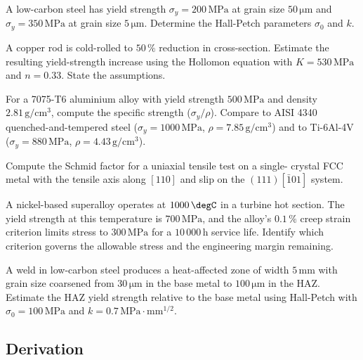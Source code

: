 \begin{exercise}
A low-carbon steel has yield strength $\sigma_y = 200\,\text{MPa}$ at
grain size $50\,\si{\micro\meter}$ and $\sigma_y = 350\,\text{MPa}$ at
grain size $5\,\si{\micro\meter}$. Determine the Hall-Petch parameters
$\sigma_0$ and $k$.
\end{exercise}

\begin{exercise}
A copper rod is cold-rolled to $50\,\%$ reduction in cross-section.
Estimate the resulting yield-strength increase using the Hollomon
equation with $K = 530\,\text{MPa}$ and $n = 0.33$. State the
assumptions.
\end{exercise}

\begin{exercise}
For a 7075-T6 aluminium alloy with yield strength $500\,\text{MPa}$
and density $2.81\,\text{g}/\text{cm}^3$, compute the specific
strength ($\sigma_y/\rho$). Compare to AISI 4340 quenched-and-tempered
steel ($\sigma_y = 1000\,\text{MPa}$, $\rho = 7.85\,\text{g}/\text{cm}^3$)
and to Ti-6Al-4V ($\sigma_y = 880\,\text{MPa}$, $\rho = 4.43\,\text{g}/
\text{cm}^3$).
\end{exercise}

\begin{exercise}
Compute the Schmid factor for a uniaxial tensile test on a single-
crystal FCC metal with the tensile axis along $[110]$ and slip on the
$(111)[\bar{1}01]$ system.
\end{exercise}

\begin{exercise}
A nickel-based superalloy operates at $1000\,\degC$ in a turbine
hot section. The yield strength at this temperature is $700\,\text{MPa}$,
and the alloy's $0.1\,\%$ creep strain criterion limits stress to
$300\,\text{MPa}$ for a $10\,000\,\text{h}$ service life. Identify
which criterion governs the allowable stress and the engineering
margin remaining.
\end{exercise}

\begin{exercise}
A weld in low-carbon steel produces a heat-affected zone of width
$5\,\text{mm}$ with grain size coarsened from $30\,\si{\micro\meter}$
in the base metal to $100\,\si{\micro\meter}$ in the HAZ. Estimate
the HAZ yield strength relative to the base metal using Hall-Petch
with $\sigma_0 = 100\,\text{MPa}$ and $k = 0.7\,\text{MPa}\cdot\text{mm}^{1/2}$.
\end{exercise}

\subsection*{Derivation}

